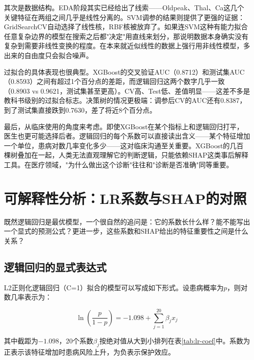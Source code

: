 \documentclass[12pt,a4paper]{ctexart}
\begin{document}
其次是数据结构。EDA阶段其实已经给出了线索——Oldpeak、Thal、Ca这几个关键特征在两组之间几乎是线性分离的。SVM调参的结果则提供了更强的证据：GridSearchCV自动选择了线性核，RBF核被放弃了。如果连SVM这种有能力拟合任意复杂边界的模型在搜索之后都"决定"用直线来划分，那说明数据本身确实没有复杂到需要非线性变换的程度。在本来就近似线性的数据上强行用非线性模型，多出来的自由度只会拟合噪声。

过拟合的具体表现也很典型。XGBoost的交叉验证AUC（0.8712）和测试集AUC（0.8593）之间有超过1个百分点的差距，而逻辑回归这两个数字几乎一致（0.8903 vs 0.9621，测试集甚至更高）。CV高、Test低、差值明显——这差不多是教科书级别的过拟合标志。决策树的情况更极端：调参后CV的AUC还有0.8387，到了测试集直接跌到0.7630，差了将近8个百分点。

最后，从临床使用的角度来考虑。即使XGBoost在某个指标上和逻辑回归打平，医生也更可能选择后者。逻辑回归的每个系数可以直接读出含义——某个特征增加一个单位，患病对数几率变化多少——这对临床沟通至关重要。XGBoost的几百棵树叠加在一起，人类无法直观理解它的判断逻辑，只能依赖SHAP这类事后解释工具。在医疗领域，"为什么做出这个诊断"往往和"诊断是否准确"同等重要。

\section{可解释性分析：LR系数与SHAP的对照}

既然逻辑回归是最优模型，一个很自然的追问是：它的系数长什么样？能不能写出一个显式的预测公式？更进一步，这些系数和SHAP给出的特征重要性之间是什么关系？

\subsection{逻辑回归的显式表达式}

L2正则化逻辑回归（C=1）拟合的模型可以写成如下形式。设患病概率为$p$，则对数几率表示为：

\begin{equation}
\ln\left(\frac{p}{1-p}\right) = -1.098 + \sum_{j=1}^{20} \beta_j x_j
\label{eq:lr}
\end{equation}

其中截距为$-1.098$，20个系数$\beta_j$按绝对值从大到小排列在表\ref{tab:lr-coef}中。系数为正表示该特征增加时患病风险上升，为负表示保护效应。
\end{document}
